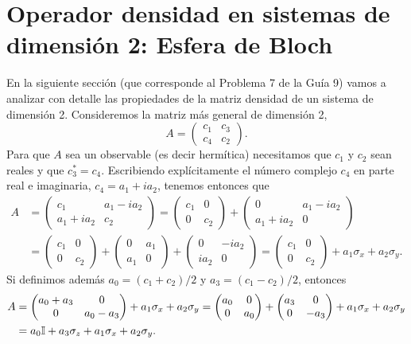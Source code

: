 \documentclass[10pt, a4paper]{article}
\numberwithin{equation}{subsection}
\begin{document}
\section{Operador densidad en sistemas de dimensión 2: Esfera de Bloch}
En la siguiente sección (que corresponde al Problema 7 de la Guía 9) vamos a
analizar con detalle las propiedades de la matriz densidad de un sistema de
dimensión 2. Consideremos la matriz más general de dimensión 2,
\begin{equation}
  A = \begin{pmatrix} c_1 & c_3 \\ c_4 & c_2 \end{pmatrix}.
\end{equation}
Para que $A$ sea un observable (es decir hermítica) necesitamos que $c_1$ y
$c_2$ sean reales y que $c_3^* = c_4$. Escribiendo explícitamente el número
complejo $c_4$ en parte real e imaginaria, $c_4 = a_1 + ia_2$, tenemos entonces
que
\begin{align}
  A &= \begin{pmatrix} c_1 & a_1 - ia_2  \\ a_1 + ia_2 & c_2 \end{pmatrix}
    = \begin{pmatrix} c_1 & 0 \\ 0 & c_2 \end{pmatrix} + 
      \begin{pmatrix} 0 & a_1 - ia_2 \\ a_1 + ia_2 & 0 \end{pmatrix} \nonumber
        \\
    &= \begin{pmatrix} c_1 & 0 \\ 0 & c_2 \end{pmatrix} + 
      \begin{pmatrix} 0 & a_1 \\ a_1 & 0 \end{pmatrix} +
      \begin{pmatrix} 0 & -ia_2 \\ ia_2 & 0 \end{pmatrix}
    = \begin{pmatrix} c_1 & 0 \\ 0 & c_2 \end{pmatrix} + 
      a_1\sigma_x + a_2\sigma_y.
\end{align}
Si definimos además $a_0 = (c_1 + c_2)/2$ y $a_3 = (c_1 - c_2)/2$, entonces
\begin{align}
  A &= \begin{pmatrix} a_0 + a_3 & 0 \\ 0 & a_0 - a_3 \end{pmatrix} + 
      a_1\sigma_x + a_2\sigma_y
    = \begin{pmatrix} a_0 & 0 \\ 0 & a_0 \end{pmatrix} + 
      \begin{pmatrix} a_3 & 0 \\ 0 & -a_3 \end{pmatrix} + 
      a_1\sigma_x + a_2\sigma_y \nonumber \\
    &= a_0\mathbb{I} + a_3\sigma_z + a_1\sigma_x + a_2\sigma_y.
\end{align}
\end{document}
